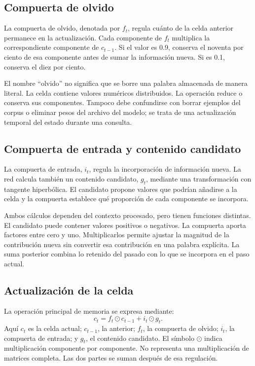 \subsection{Compuerta de olvido}
La compuerta de olvido, denotada por $f_t$, regula cuánto de la celda anterior permanece en la actualización. Cada componente de $f_t$ multiplica la correspondiente componente de $c_{t-1}$. Si el valor es 0.9, conserva el noventa por ciento de esa componente antes de sumar la información nueva. Si es 0.1, conserva el diez por ciento.

El nombre ``olvido'' no significa que se borre una palabra almacenada de manera literal. La celda contiene valores numéricos distribuidos. La operación reduce o conserva sus componentes. Tampoco debe confundirse con borrar ejemplos del corpus o eliminar pesos del archivo del modelo; se trata de una actualización temporal del estado durante una consulta.

\subsection{Compuerta de entrada y contenido candidato}
La compuerta de entrada, $i_t$, regula la incorporación de información nueva. La red calcula también un contenido candidato, $g_t$, mediante una transformación con tangente hiperbólica. El candidato propone valores que podrían añadirse a la celda y la compuerta establece qué proporción de cada componente se incorpora.

Ambos cálculos dependen del contexto procesado, pero tienen funciones distintas. El candidato puede contener valores positivos o negativos. La compuerta aporta factores entre cero y uno. Multiplicarlos permite ajustar la magnitud de la contribución nueva sin convertir esa contribución en una palabra explícita. La suma posterior combina lo retenido del pasado con lo que se incorpora en el paso actual.

\subsection{Actualización de la celda}
La operación principal de memoria se expresa mediante:
\begin{equation}\label{eq:celda}
c_t=f_t\odot c_{t-1}+i_t\odot g_t.
\end{equation}
Aquí $c_t$ es la celda actual; $c_{t-1}$, la anterior; $f_t$, la compuerta de olvido; $i_t$, la compuerta de entrada; y $g_t$, el contenido candidato. El símbolo $\odot$ indica multiplicación componente por componente. No representa una multiplicación de matrices completa. Las dos partes se suman después de esa regulación.

